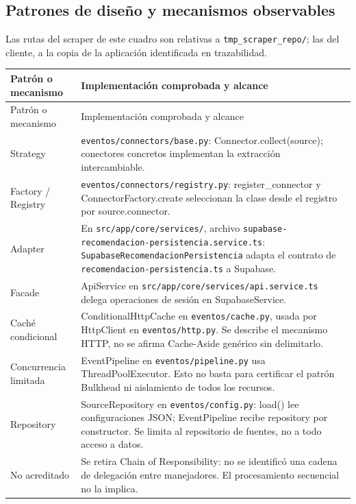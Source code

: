 \documentclass[11pt,a4paper]{article}
\begin{document}
\subsection{Patrones de diseño y mecanismos observables}
Las rutas del scraper de este cuadro son relativas a \texttt{tmp\_scraper\_repo/};
las del cliente, a la copia de la aplicación identificada en trazabilidad.
\begin{longtable}{p{3.1cm}p{10.6cm}}
\toprule Patrón o mecanismo & Implementación comprobada y alcance \\\midrule\endfirsthead
\toprule Patrón o mecanismo & Implementación comprobada y alcance \\\midrule\endhead
Strategy & \nolinkurl{eventos/connectors/base.py}: Connector.collect(source); conectores concretos implementan la extracción intercambiable. \\
Factory / Registry & \nolinkurl{eventos/connectors/registry.py}: register\_connector y ConnectorFactory.create seleccionan la clase desde el registro por source.connector. \\
Adapter & En \nolinkurl{src/app/core/services/}, archivo \nolinkurl{supabase-recomendacion-persistencia.service.ts}: \nolinkurl{SupabaseRecomendacionPersistencia} adapta el contrato de \nolinkurl{recomendacion-persistencia.ts} a Supabase. \\
Facade & ApiService en \nolinkurl{src/app/core/services/api.service.ts} delega operaciones de sesión en SupabaseService. \\
Caché condicional & ConditionalHttpCache en \nolinkurl{eventos/cache.py}, usada por HttpClient en \nolinkurl{eventos/http.py}. Se describe el mecanismo HTTP, no se afirma Cache-Aside genérico sin delimitarlo. \\
Concurrencia limitada & EventPipeline en \nolinkurl{eventos/pipeline.py} usa ThreadPoolExecutor. Esto no basta para certificar el patrón Bulkhead ni aislamiento de todos los recursos. \\
Repository & SourceRepository en \nolinkurl{eventos/config.py}: load() lee configuraciones JSON; EventPipeline recibe repository por constructor. Se limita al repositorio de fuentes, no a todo acceso a datos. \\
No acreditado & Se retira Chain of Responsibility: no se identificó una cadena de delegación entre manejadores. El procesamiento secuencial no la implica. \\
\bottomrule\end{longtable}
\end{document}
